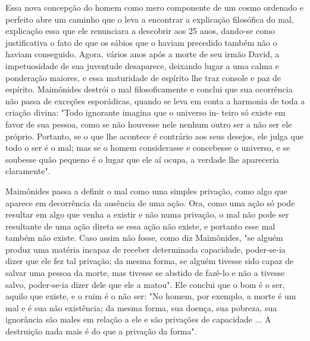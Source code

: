 Essa nova concepção do homem como mero componente de um cosmo ordenado e
perfeito abre um caminho que o leva a encontrar a explica­ção filosófica
do mal, explicação essa que ele renunciara a descobrir aos 25 anos,
dando-se como justificativa o fato de que os sábios que o haviam
precedido também não o haviam conseguido. Agora, vários anos após a
morte de seu ir­mão David, a impetuosidade de sua juventude desaparece,
deixando lugar a uma calma e ponderação maiores, e essa maturidade de
espírito lhe traz console e paz de espírito. Maimônides destrói o mal
filosoficamente e conclui que sua ocorrência não passa de exceções
esporádicas, quando se leva em conta a har­monia de toda a criação
divina: "Todo ignorante imagina que o universo in-
teiro só existe em favor de sua pessoa, como se não houvesse nele nenhum
outro ser a não ser ele próprio. Portanto, se o que lhe acontece é
contrário aos seus desejos, ele julga que todo o ser é o mal; mas se o
homem considerasse e concebesse o universo, e se soubesse quão pequeno é
o lugar que ele aí ocu­pa, a verdade lhe apareceria claramente".

Maimônides passa a definir o mal como uma simples privação, co­mo algo
que aparece em decorrência da ausência de uma ação. Ora, como uma ação
só pode resultar em algo que venha a existir e não numa privação, o mal
não pode ser resultante de uma ação direta se essa ação não existe, e
portanto esse mal também não existe. Caso assim não fosse, como diz
Maimônides, "se alguém produz uma matéria incapaz de receber determinada
capacidade, poder-se-ia dizer que ele fez tal privação; da mesma forma,
se alguém tivesse sido ca­paz de salvar uma pessoa da morte, mas tivesse
se abstido de fazê-lo e não a tivesse salvo, poder-se-ia dizer dele que
ele a matou". Ele conclui que o bom é o ser, aquilo que existe, e o ruim
é o não ser: "No homem, por exemplo, a morte é um mal e é sua não
existência; da mesma forma, sua doença, sua po­breza, sua ignorância são
males em relação a ele e são privações de capacidade ... A destruição
nada mais é do que a privação da forma".


